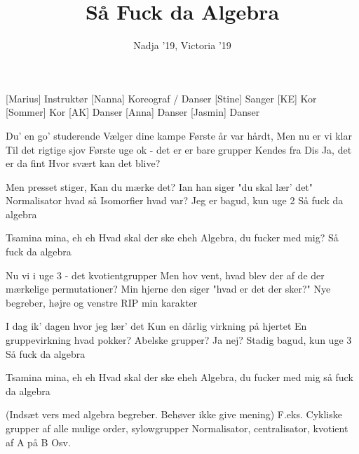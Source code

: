 \documentclass[a4paper,11pt]{article}
\title{Så Fuck da Algebra}
\author{Nadja '19, Victoria '19}
\begin{document}
\maketitle

\begin{roles}
[Marius] Instruktør
[Nanna] Koreograf / Danser
[Stine] Sanger
[KE] Kor
[Sommer] Kor
[AK] Danser
[Anna] Danser
[Jasmin] Danser
\end{roles}

\begin{song}
 Du' en go' studerende
Vælger dine kampe
Første år var hårdt,
Men nu er vi klar
Til det rigtige sjov
Første uge ok -
det er er bare grupper
Kendes fra Dis
Ja, det er da fint
Hvor svært kan det blive?

 Men presset stiger,
Kan du mærke det?
Ian han siger
"du skal lær' det"
Normalisator hvad så
Isomorfier hvad var?
Jeg er bagud, kun uge 2
Så fuck da algebra

 Tsamina mina, eh eh
Hvad skal der ske eheh
Algebra, du fucker med mig?
Så fuck da algebra

 Nu vi i uge 3 - det kvotientgrupper
Men hov vent, hvad blev der
af de der mærkelige
permutationer?
Min hjerne den siger
"hvad er det der sker?"
Nye begreber, højre og venstre
RIP min karakter

 I dag ik' dagen
hvor jeg lær' det
Kun en dårlig virkning
på hjertet
En gruppevirkning hvad pokker?
Abelske grupper? Ja nej?
Stadig bagud, kun uge 3
Så fuck da algebra

 Tsamina mina, eh eh
Hvad skal der ske eheh
Algebra, du fucker med mig
så fuck da algebra

 (Indsæt vers med algebra begreber. Behøver ikke give mening)
F.eks.
Cykliske grupper af alle mulige order, sylowgrupper
Normalisator, centralisator, kvotient af A på B
Osv.
\end{song}
\end{document}
